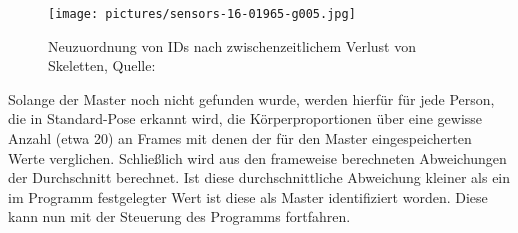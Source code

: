  \begin{figure}
\texttt{[image: pictures/sensors-16-01965-g005.jpg]}
\caption{Neuzuordnung von IDs nach zwischenzeitlichem \glqq Verlust\grqq{} von Skeletten, Quelle:\cite{bodyprop}}
\label{fig:fehlerk2}
\end{figure}
 \par
 Solange der Master noch nicht gefunden wurde, werden hierfür für jede Person, die in Standard-Pose erkannt wird, die Körperproportionen über eine gewisse Anzahl (etwa 20) an Frames mit denen der für den Master eingespeicherten Werte verglichen. Schließlich wird aus den frameweise berechneten Abweichungen der Durchschnitt berechnet. Ist diese durchschnittliche Abweichung kleiner als ein im Programm festgelegter Wert ist diese als Master identifiziert worden. Diese kann nun mit der Steuerung des Programms fortfahren.
	
	
